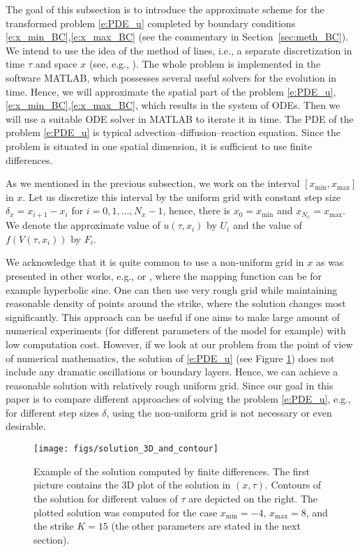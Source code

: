 \documentclass[a4paper,10pt]{article}
\newcommand{\1}{\mathbf{1}}
\begin{document}
The goal of this subsection is to introduce the approximate scheme for the transformed problem \eqref{e:PDE_u} completed by boundary conditions \eqref{e:x_min_BC},\eqref{e:x_max_BC} (see the commentary in Section~\ref{sec:meth_BC}). We intend to use the idea of the method of lines, i.e., a separate discretization in time $\tau$ and space $x$ (see, e.g., \cite[Chapter 13]{LeVeque07}). The whole problem is implemented in the software MATLAB, which possesses several useful solvers for the evolution in time. Hence, we will approximate the spatial part of the problem \eqref{e:PDE_u},\eqref{e:x_min_BC},\eqref{e:x_max_BC}, which results in the system of ODEs. Then we will use a suitable ODE solver in MATLAB to iterate it in time. The PDE of the problem \eqref{e:PDE_u} is typical advection--diffusion--reaction equation. Since the problem is situated in one spatial dimension, it is sufficient to use finite differences.

As we mentioned in the previous subsection, we work on the interval $[x_{\min},x_{\max}]$ in $x$. Let us discretize this interval by the uniform grid with constant step size $\delta_x = x_{i+1}-x_{i}$ for $i = 0,1,\ldots, N_x-1$, hence, there is $x_{0}=x_{\min}$ and $x_{N_x}=x_{\max}$. We denote the approximate value of $u(\tau,x_{i})$ by $U_{i}$ and the value of $f(V(\tau,x_{i}))$ by $F_{i}$. 

We acknowledge that it is quite common to use a non-uniform grid in $x$ as was presented in other works, e.g., \cite[Chap. 10]{Rouah13} or \cite[Sec. 4.2]{Hout17}, where the mapping function can be for example hyperbolic sine. One can then use very rough grid while maintaining reasonable density of points around the strike, where the solution changes most significantly. This approach can be useful if one aims to make large amount of numerical experiments (for different parameters of the model for example) with low computation cost. However, if we look at our problem from the point of view of numerical mathematics, the solution of \eqref{e:PDE_u} (see Figure \ref{FIG:solution example}) does not include any dramatic oscillations or boundary layers. Hence, we can achieve a reasonable solution with relatively rough uniform grid. Since our goal in this paper is to compare different approaches of solving the problem \eqref{e:PDE_u}, e.g., for different step sizes $\delta$, using the non-uniform grid is not necessary or even desirable. 
 
\begin{figure}[!ht]
\texttt{[image: figs/solution\_3D\_and\_contour]}
\caption{Example of the solution computed by finite differences. The first picture contains the 3D plot of the solution in $(x,\tau)$. Contours of the solution for different values of $\tau$ are depicted on the right. The plotted solution was computed for the case $x_{\min} = -4$, $x_{\max} = 8$, and the strike $K = 15$ (the other parameters are stated in the next section).}\label{FIG:solution example}
\end{figure}
\end{document}
